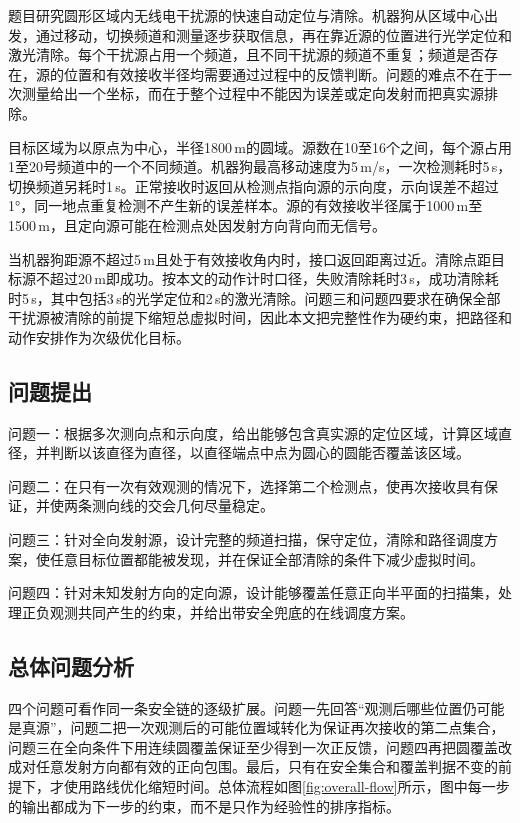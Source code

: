 \documentclass[UTF8,12pt,a4paper]{ctexart}
\renewcommand{\heiti}{\CJKfamily{hei}}
\newcommand{\enquote}[1]{“#1”}
\numberwithin{equation}{section}
\begin{document}
题目研究圆形区域内无线电干扰源的快速自动定位与清除。机器狗从区域中心出发，通过移动，切换频道和测量逐步获取信息，再在靠近源的位置进行光学定位和激光清除。每个干扰源占用一个频道，且不同干扰源的频道不重复；频道是否存在，源的位置和有效接收半径均需要通过过程中的反馈判断。问题的难点不在于一次测量给出一个坐标，而在于整个过程中不能因为误差或定向发射而把真实源排除。

目标区域为以原点为中心，半径1800\,m的圆域。源数在10至16个之间，每个源占用1至20号频道中的一个不同频道。机器狗最高移动速度为5\,m/s，一次检测耗时5\,s，切换频道另耗时1\,s。正常接收时返回从检测点指向源的示向度，示向误差不超过1°，同一地点重复检测不产生新的误差样本。源的有效接收半径属于1000\,m至1500\,m，且定向源可能在检测点处因发射方向背向而无信号。

当机器狗距源不超过5\,m且处于有效接收角内时，接口返回距离过近。清除点距目标源不超过20\,m即成功。按本文的动作计时口径，失败清除耗时3\,s，成功清除耗时5\,s，其中包括3\,s的光学定位和2\,s的激光清除。问题三和问题四要求在确保全部干扰源被清除的前提下缩短总虚拟时间，因此本文把完整性作为硬约束，把路径和动作安排作为次级优化目标。

\subsection{问题提出}

{\heiti 问题一：}根据多次测向点和示向度，给出能够包含真实源的定位区域，计算区域直径，并判断以该直径为直径，以直径端点中点为圆心的圆能否覆盖该区域。

{\heiti 问题二：}在只有一次有效观测的情况下，选择第二个检测点，使再次接收具有保证，并使两条测向线的交会几何尽量稳定。

{\heiti 问题三：}针对全向发射源，设计完整的频道扫描，保守定位，清除和路径调度方案，使任意目标位置都能被发现，并在保证全部清除的条件下减少虚拟时间。

{\heiti 问题四：}针对未知发射方向的定向源，设计能够覆盖任意正向半平面的扫描集，处理正负观测共同产生的约束，并给出带安全兜底的在线调度方案。

\subsection{总体问题分析}

四个问题可看作同一条安全链的逐级扩展。问题一先回答\enquote{观测后哪些位置仍可能是真源}，问题二把一次观测后的可能位置域转化为保证再次接收的第二点集合，问题三在全向条件下用连续圆覆盖保证至少得到一次正反馈，问题四再把圆覆盖改成对任意发射方向都有效的正向包围。最后，只有在安全集合和覆盖判据不变的前提下，才使用路线优化缩短时间。总体流程如图\ref{fig:overall-flow}所示，图中每一步的输出都成为下一步的约束，而不是只作为经验性的排序指标。
\end{document}
